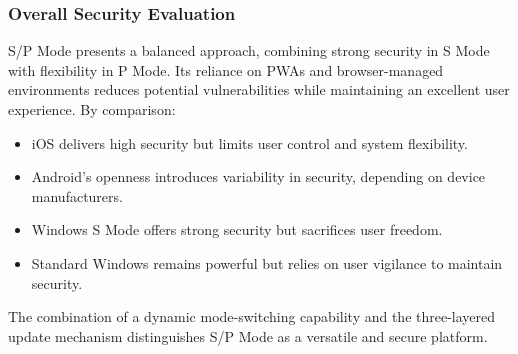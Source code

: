 \subsubsection{Overall Security Evaluation}
S/P Mode presents a balanced approach, combining strong security in S Mode with flexibility in P Mode. Its reliance on PWAs and browser-managed environments reduces potential vulnerabilities while maintaining an excellent user experience. By comparison:
\begin{itemize}
    \item iOS delivers high security but limits user control and system flexibility.
    \item Android's openness introduces variability in security, depending on device manufacturers.
    \item Windows S Mode offers strong security but sacrifices user freedom.
    \item Standard Windows remains powerful but relies on user vigilance to maintain security.
\end{itemize}

The combination of a dynamic mode-switching capability and the three-layered update mechanism distinguishes S/P Mode as a versatile and secure platform.


